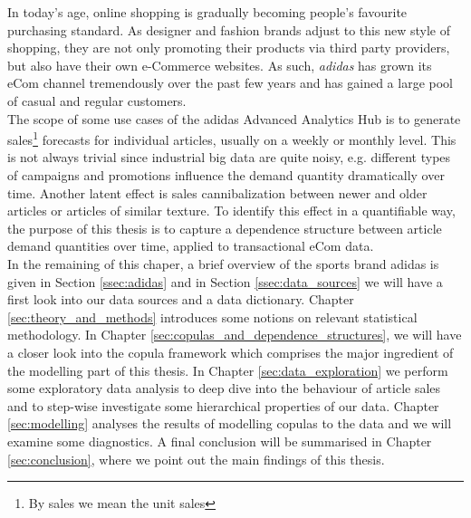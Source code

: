 

In today's age, online shopping is gradually becoming people's favourite purchasing standard. As designer and fashion brands adjust to this new style of shopping, they are not only promoting their products via third party 	providers, but also have their own e-Commerce websites. As such, \textit{adidas} has grown its eCom channel tremendously over the past few years and has gained a large pool of casual and regular customers.\\

The scope of some use cases of the adidas Advanced Analytics Hub is to generate sales\footnote{By sales we mean the unit sales} forecasts for individual articles, usually on a weekly or monthly level. This is not always trivial since industrial big data are quite noisy, e.g. different types of campaigns and promotions influence the demand quantity dramatically over time. Another latent effect is sales cannibalization between newer and older articles or articles of similar texture. To identify this effect in a quantifiable way, the purpose of this thesis is to capture a dependence structure between article demand quantities over time, applied to transactional eCom data. \\

In the remaining of this chaper, a brief overview of the sports brand adidas is given in Section \ref{ssec:adidas} and in Section \ref{ssec:data_sources} we will have a first look into our data sources and a data dictionary. Chapter \ref{sec:theory_and_methods} introduces some notions on relevant statistical methodology. In Chapter \ref{sec:copulas_and_dependence_structures}, we will have a closer look into the copula framework which comprises the major ingredient of the modelling part of this thesis. In Chapter \ref{sec:data_exploration} we perform some exploratory data analysis to deep dive into the behaviour of article sales and to step-wise investigate some hierarchical properties of our data.  Chapter \ref{sec:modelling} analyses the results of modelling copulas to the data and we will examine some diagnostics. A final conclusion will be summarised in Chapter \ref{sec:conclusion}, where we point out the main findings of this thesis.




